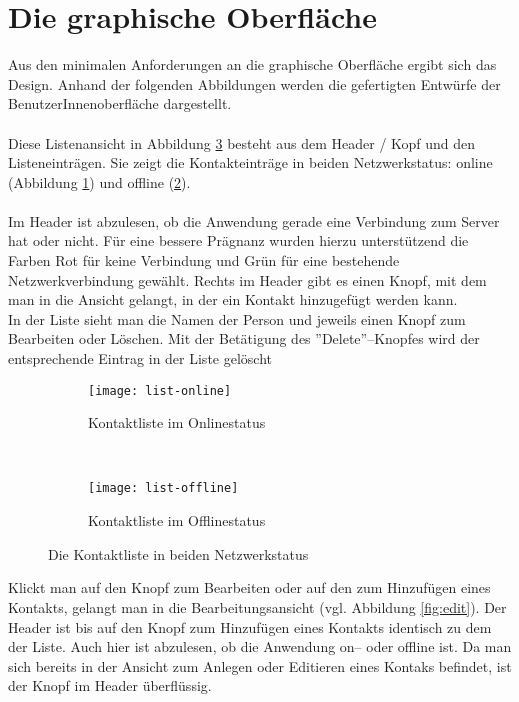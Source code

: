 \section{Die graphische Oberfläche}
Aus den minimalen Anforderungen an die graphische Oberfläche ergibt sich das Design.
Anhand der folgenden Abbildungen werden die gefertigten Entwürfe der BenutzerInnenoberfläche dargestellt.\\\\
Diese Listenansicht in Abbildung \ref{fig:list} besteht aus dem Header / Kopf und den Listeneinträgen.
Sie zeigt die Kontakteinträge in beiden Netzwerkstatus: online (Abbildung \ref{fig:list-online}) und offline (\ref{fig:list-offline}).\\\\
%
%
Im Header ist abzulesen, ob die Anwendung gerade eine Verbindung zum Server hat oder nicht.
Für eine bessere Prägnanz wurden hierzu unterstützend die Farben Rot für keine Verbindung und Grün für eine bestehende Netzwerkverbindung gewählt.
Rechts im Header gibt es einen Knopf, mit dem man in die Ansicht gelangt, in der ein Kontakt hinzugefügt werden kann.\\
%
In der Liste sieht man die Namen der Person und jeweils einen Knopf zum Bearbeiten oder Löschen.
Mit der Betätigung des ''Delete''--Knopfes wird der entsprechende Eintrag in der Liste gelöscht
\begin{figure}[H]
  \centering
  \begin{subfigure}[t]{0.49\textwidth}
          \texttt{[image: list-online]}
          \caption{Kontaktliste im Onlinestatus}
          \label{fig:list-online}
  \end{subfigure}
  ~ 
  \begin{subfigure}[t]{0.49\textwidth}
          \texttt{[image: list-offline]}
          \caption{Kontaktliste im Offlinestatus}
          \label{fig:list-offline}
  \end{subfigure}
  \grayRule
  \caption{Die Kontaktliste in beiden Netzwerkstatus}
  \label{fig:list}
\end{figure}
Klickt man auf den Knopf zum Bearbeiten oder auf den zum Hinzufügen eines Kontakts, gelangt man in die Bearbeitungsansicht (vgl. Abbildung \ref{fig:edit}). Der Header ist bis auf den Knopf zum Hinzufügen eines Kontakts identisch zu dem der Liste. Auch hier ist abzulesen, ob die Anwendung on-- oder offline ist. Da man sich bereits in der Ansicht zum Anlegen oder Editieren eines Kontaks befindet, ist der Knopf im Header überflüssig.\\

